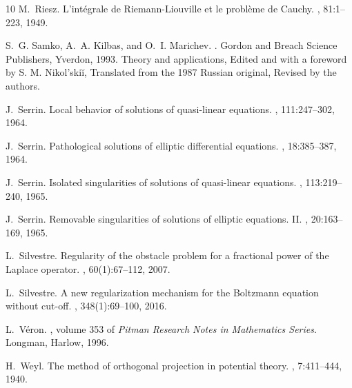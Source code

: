 \documentclass[11pt]{amsart}
\theoremstyle{plain}
\theoremstyle{definition}
\numberwithin{equation}{section}
\begin{document}
\begin{thebibliography}{10}
M.~Riesz.
\newblock L'int\'egrale de {R}iemann-{L}iouville et le probl\`eme de {C}auchy.
, 81:1--223, 1949.

S.~G. Samko, A.~A. Kilbas, and O.~I. Marichev.
.
\newblock Gordon and Breach Science Publishers, Yverdon, 1993.
\newblock Theory and applications, Edited and with a foreword by S. M.
  Nikol'ski\u i, Translated from the 1987 Russian original, Revised by the
  authors.

J.~Serrin.
\newblock Local behavior of solutions of quasi-linear equations.
, 111:247--302, 1964.

J.~Serrin.
\newblock Pathological solutions of elliptic differential equations.
, 18:385--387, 1964.

J.~Serrin.
\newblock Isolated singularities of solutions of quasi-linear equations.
, 113:219--240, 1965.

J.~Serrin.
\newblock Removable singularities of solutions of elliptic equations. {II}.
, 20:163--169, 1965.

L.~Silvestre.
\newblock Regularity of the obstacle problem for a fractional power of the
  {L}aplace operator.
, 60(1):67--112, 2007.

L.~Silvestre.
\newblock A new regularization mechanism for the {B}oltzmann equation without
  cut-off.
, 348(1):69--100, 2016.

L.~V\'eron.
, volume 353 of {\em Pitman Research Notes in Mathematics Series}.
\newblock Longman, Harlow, 1996.

H.~Weyl.
\newblock The method of orthogonal projection in potential theory.
, 7:411--444, 1940.

\end{thebibliography}


%
%
\end{document}
